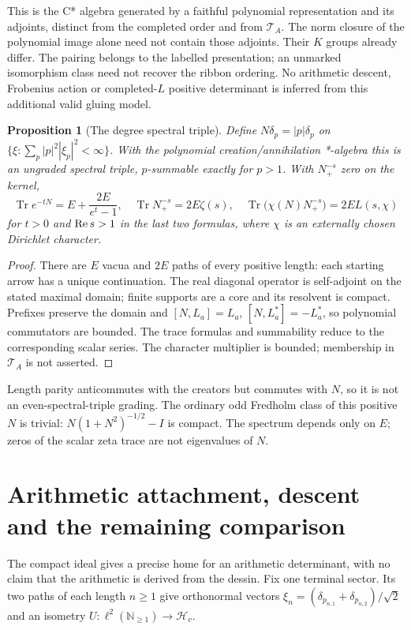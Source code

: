 \documentclass[11pt]{article}
\newtheorem{proposition}[theorem]{Proposition}
\theoremstyle{definition}\newtheorem{definition}[theorem]{Definition}
\theoremstyle{remark}\newtheorem{remark}[theorem]{Remark}
\begin{document}
This is the C* algebra generated by a faithful polynomial representation and its adjoints, distinct from the completed order and from $\mathcal T_A$. The norm closure of the polynomial image alone need not contain those adjoints. Their $K$ groups already differ. The pairing belongs to the labelled presentation; an unmarked isomorphism class need not recover the ribbon ordering. No arithmetic descent, Frobenius action or completed-$L$ positive determinant is inferred from this additional valid gluing model.


\begin{proposition}[The degree spectral triple]\label{thm:degree}
Define $N\delta_p=|p|\delta_p$ on $\{\xi:\sum_p|p|^2|\xi_p|^2<\infty\}$. With the polynomial creation/annihilation *-algebra this is an ungraded spectral triple, $p$-summable exactly for $p>1$. With $N_+^{-s}$ zero on the kernel,
\[
 \operatorname{Tr}e^{-tN}=E+\frac{2E}{e^t-1},\quad
 \operatorname{Tr}N_+^{-s}=2E\zeta(s),\quad
 \operatorname{Tr}\bigl(\chi(N)N_+^{-s}\bigr)=2E L(s,\chi)
\]
for $t>0$ and $\operatorname{Re} s>1$ in the last two formulas, where $\chi$ is an externally chosen Dirichlet character.
\end{proposition}
\begin{proof}
There are $E$ vacua and $2E$ paths of every positive length: each starting arrow has a unique continuation. The real diagonal operator is self-adjoint on the stated maximal domain; finite supports are a core and its resolvent is compact. Prefixes preserve the domain and $[N,L_a]=L_a$, $[N,L_a^*]=-L_a^*$, so polynomial commutators are bounded. The trace formulas and summability reduce to the corresponding scalar series. The character multiplier is bounded; membership in $\mathcal T_A$ is not asserted.
\end{proof}
Length parity anticommutes with the creators but commutes with $N$, so it is not an even-spectral-triple grading. The ordinary odd Fredholm class of this positive $N$ is trivial: $N(1+N^2)^{-1/2}-I$ is compact. The spectrum depends only on $E$; zeros of the scalar zeta trace are not eigenvalues of $N$.

\section{Arithmetic attachment, descent and the remaining comparison}
The compact ideal gives a precise home for an arithmetic determinant, with no claim that the arithmetic is derived from the dessin. Fix one terminal sector. Its two paths of each length $n\ge1$ give orthonormal vectors $\xi_n=(\delta_{p_{n,1}}+\delta_{p_{n,2}})/\sqrt2$ and an isometry $U:\ell^2(\mathbb N_{\ge1})\to\mathcal H_v$.
\end{document}
